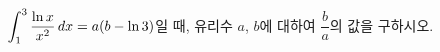 \hspace*{2mm}\begin{minipage}[t]{\dimexpr\linewidth-2mm\relax}\vspace{0pt}
$\displaystyle\int_{1}^{3}\dfrac{\ln x}{x^2}\mkern3mu dx=a(b-\ln 3)$일 때, 유리수 $a$, $b$에 대하여 $\dfrac{b}{a}$의 값을 구하시오.\end{minipage}
